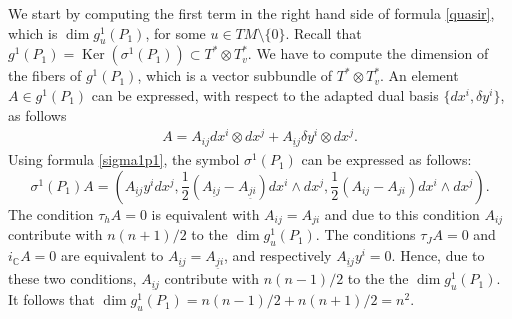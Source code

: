 We start by computing the f\/irst term in the right hand side of formula
\eqref{quasir}, which is $\dim g^1_u(P_1)$, for some $u\in
TM\setminus\{0\}$. Recall that $g^1(P_1)=\operatorname{Ker} \left(\sigma^1(P_1)\right)
\subset T^*\otimes T^*_v$.  We have to compute the dimension of
the f\/ibers of $g^1(P_1)$, which is a vector subbundle of $ T^*\otimes T^*_v$. An element $A\in
g^1(P_1)$ can be expressed, with respect to the adapted dual basis
$\{dx^i, \delta y^i\}$, as follows
\begin{gather*}
A=A_{ij}dx^i\otimes dx^j + A_{\underline{i}j}\delta y^i \otimes
dx^j. %
\end{gather*} Using formula \eqref{sigma1p1},
the symbol $\sigma^1(P_1)$ can be expressed as follows:
\[
\sigma^1(P_1)A=\left( A_{\underline{i}j}y^idx^j, \frac{1}{2}(
A_{\underline{i}j}- A_{\underline{j}i})dx^i\wedge dx^j,
\frac{1}{2}(A_{ij}- A_{ji})dx^i\wedge dx^j\right).
\]
The condition $\tau_hA=0$ is equivalent with $A_{ij}=A_{ji}$ and due
to this condition $A_{ij}$ contribute with $n(n+1)/2$ to the $\dim g^1_u(P_1)$. The conditions
$\tau_JA=0$ and $i_{\mathbb{C}}A=0$ are equivalent to
$A_{\underline{i}j}=A_{\underline{j}i}$, and respectively
$A_{\underline{i}j}y^i=0$. Hence, due to these two conditions,
$A_{\underline{i}j}$ contribute
with $n(n-1)/2$ to the the $\dim g^1_u(P_1)$. It follows that $\dim
g^{1}_u(P_1)=n(n-1)/2 + n(n+1)/2 = n^2.$

